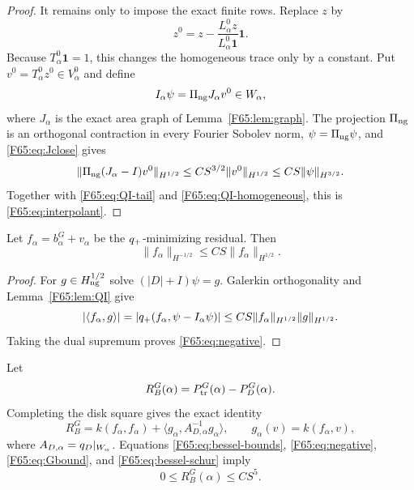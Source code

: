 \begin{proof}
It remains only to impose the exact finite rows.  Replace \(z\) by
\begin{equation*}
 z^0=z-\frac{L_\alpha^0z}{L_\alpha^0\mathbf1}\mathbf1.
\end{equation*}
Because \(T_\alpha^0\mathbf1=1\), this changes the homogeneous trace only
by a constant.  Put \(v^0=T_\alpha^0z^0\in V_\alpha^0\) and define
\begin{equation}
 I_\alpha\psi=\Pi_{\rm ng} J_\alpha v^0\in W_\alpha,
\end{equation}
where \(J_\alpha\) is the exact area graph of
Lemma~\ref{F65:lem:graph}.  The projection \(\Pi_{\rm ng}\) is an orthogonal
contraction in every Fourier Sobolev norm, \(\psi=\Pi_{\rm ng}\psi\), and
\eqref{F65:eq:Jclose} gives
\begin{equation*}
 \|\Pi_{\rm ng}(J_\alpha-I)v^0\|_{H^{1/2}}
 \le CS^{3/2}\|v^0\|_{H^{1/2}}
 \le CS\|\psi\|_{H^{3/2}}.
\end{equation*}
Together with \eqref{F65:eq:QI-tail} and
\eqref{F65:eq:QI-homogeneous}, this is \eqref{F65:eq:interpolant}.
\end{proof}

\begin{lemma}\label{F65:lem:negative}
Let $f_\alpha=b_\alpha^G+v_\alpha$ be the $q_+$-minimizing residual.
Then
\begin{equation}\label{F65:eq:negative}
 \|f_\alpha\|_{H^{-1/2}}
 \le CS\|f_\alpha\|_{H^{1/2}}.
\end{equation}
\end{lemma}

\begin{proof}
For $g\in H_{\rm ng}^{1/2}$ solve $(|D|+I)\psi=g$.  Galerkin
orthogonality and Lemma~\ref{F65:lem:QI} give
\begin{equation}
 |\langle f_\alpha,g\rangle|
 =|q_+(f_\alpha,\psi-I_\alpha\psi)|
 \le CS\|f_\alpha\|_{H^{1/2}}\|g\|_{H^{1/2}}.
\end{equation}
Taking the dual supremum proves \eqref{F65:eq:negative}.
\end{proof}

Let
\begin{equation}
 R_B^G(\alpha)=P_{\rm tr}^G(\alpha)-P_D^G(\alpha).
\end{equation}
Completing the disk square gives the exact identity
\begin{equation}\label{F65:eq:bessel-schur}
 R_B^G
 =k(f_\alpha,f_\alpha)
 +\langle g_\alpha,A_{D,\alpha}^{-1}g_\alpha\rangle,
 \qquad g_\alpha(v)=k(f_\alpha,v),
\end{equation}
where $A_{D,\alpha}=q_D|_{W_\alpha}$.
Equations \eqref{F65:eq:bessel-bounds}, \eqref{F65:eq:negative},
\eqref{F65:eq:Gbound}, and \eqref{F65:eq:bessel-schur} imply
\begin{equation}\label{F65:eq:bessel-absolute}
 0\le R_B^G(\alpha)\le CS^5.
\end{equation}

